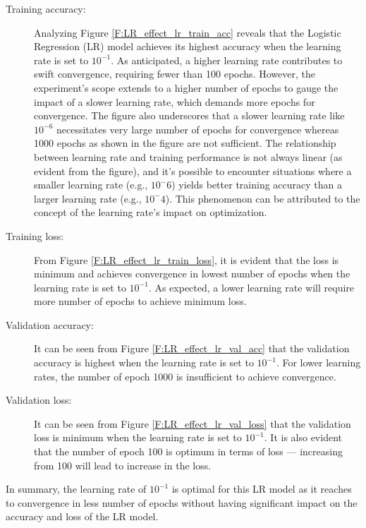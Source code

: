 \documentclass[12pt, a4paper, twoside]{article}
\begin{document}
\begin{description}
\item[Training accuracy:] Analyzing Figure \ref{F:LR_effect_lr_train_acc} reveals that the Logistic Regression (LR) model achieves its highest accuracy when the learning rate is set to $10^{-1}$. As anticipated, a higher learning rate contributes to swift convergence, requiring fewer than 100 epochs. However, the experiment's scope extends to a higher number of epochs to gauge the impact of a slower learning rate, which demands more epochs for convergence. The figure also underscores that a slower learning rate like $10^{-6}$ necessitates very large number of epochs for convergence whereas 1000 epochs as shown in the figure are not sufficient.  The relationship between learning rate and training performance is not always linear (as evident from the figure), and it's possible to encounter situations where a smaller learning rate (e.g., $10^-6$) yields better training accuracy than a larger learning rate (e.g., $10^-4$). This phenomenon can be attributed to the concept of the learning rate's impact on optimization.
\item[Training loss:] From Figure \ref{F:LR_effect_lr_train_loss}, it is evident that the loss is minimum and achieves convergence in lowest number of epochs when the learning rate is set to $10^{-1}$. As expected, a lower learning rate will require more number of epochs to achieve minimum loss.
\item[Validation accuracy:] It can be seen from Figure \ref{F:LR_effect_lr_val_acc} that the validation accuracy is highest when the learning rate is set to $10^{-1}$.  For lower learning rates, the number of epoch 1000 is insufficient to achieve convergence.
\item[Validation loss:] It can be seen from Figure \ref{F:LR_effect_lr_val_loss} that the validation loss is minimum when the learning rate is set to $10^{-1}$. It is also evident that the number of epoch 100 is optimum in terms of loss --- increasing from 100 will lead to increase in the loss.
\end{description}
\par
In summary, the learning rate of $10^{-1}$ is optimal for this LR model as it reaches to convergence in less number of epochs without having significant impact on the accuracy and loss of the LR model.
\end{document}
